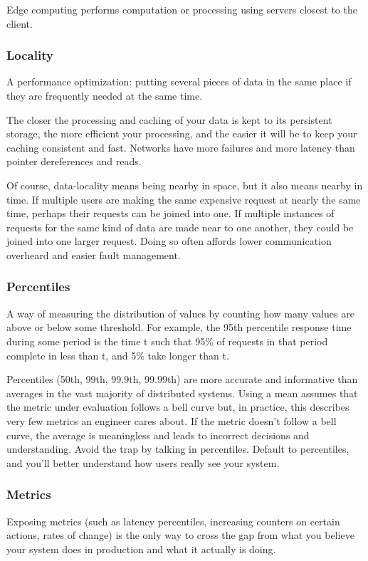 \documentclass{article}
\begin{document}
    Edge computing performs computation or processing using servers closest to the client.
    
    \subsubsection{Locality}
    A performance optimization: putting several pieces of data in the same place if they are frequently needed at the same time.
    
    The closer the processing and caching of your data is kept to its persistent storage, the more efficient your processing, and the easier it will be to keep your caching consistent and fast. Networks have more failures and more latency than pointer dereferences and reads.
    
    Of course, data-locality means being nearby in space, but it also means nearby in time. If multiple users are making the same expensive request at nearly the same time, perhaps their requests can be joined into one. If multiple instances of requests for the same kind of data are made near to one another, they could be joined into one larger request. Doing so often affords lower communication overheard and easier fault management.
    
    \subsubsection{Percentiles}
    A way of measuring the distribution of values by counting how many values are above or below some threshold. For example, the 95th percentile response time during some period is the time t such that 95\% of requests in that period complete in less than t, and 5\% take longer than t.
    
    Percentiles (50th, 99th, 99.9th, 99.99th) are more accurate and informative than averages in the vast majority of distributed systems. Using a mean assumes that the metric under evaluation follows a bell curve but, in practice, this describes very few metrics an engineer cares about. If the metric doesn’t follow a bell curve, the average is meaningless and leads to incorrect decisions and understanding. Avoid the trap by talking in percentiles. Default to percentiles, and you’ll better understand how users really see your system.
    
    \subsubsection{Metrics}
    Exposing metrics (such as latency percentiles, increasing counters on certain actions, rates of change) is the only way to cross the gap from what you believe your system does in production and what it actually is doing. 
    
\end{document}
